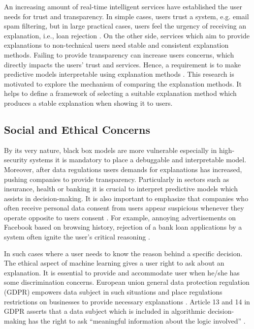 \documentclass[english]{tktltiki2}
\theoremstyle{definition}
\theoremstyle{remark}
\begin{document}
An increasing amount of real-time intelligent services have established the user needs for trust and transparency. In simple cases, users trust a system, e.g. email spam filtering, but in large practical cases, users feel the urgency of receiving an explanation, i.e., loan rejection \citep{guidotti2018survey}. On the other side, services which aim to provide explanations to non-technical users need stable and consistent explanation methods. Failing to provide transparency can increase users concerns, which directly impacts the users' trust and services. Hence, a requirement is to make predictive models interpretable using explanation methods \cite{guidotti2018survey}. This research is motivated to explore the mechanism of comparing the explanation methods. It helps to define a framework of selecting a suitable explanation method which produces a stable explanation when showing it to users.

\subsection{Social and Ethical Concerns} %
By its very nature, black box models are more vulnerable especially in high-security systems it is mandatory to place a debuggable and interpretable model. Moreover, after data regulations users demands for explanations has increased, pushing companies to provide transparency. Particularly in sectors such as insurance, health or banking it is crucial to interpret predictive models which assists in decision-making. It is also important to emphasize that companies who often receive personal data consent from users appear suspicious whenever they operate opposite to users consent \citep{lipton2016mythos}. For example, annoying advertisements on Facebook based on browsing history, rejection of a bank loan applications by a system often ignite the user's critical reasoning \citep{honegger2018shedding}.

In such cases where a user needs to know the reason behind a specific decision. The ethical aspect of machine learning gives a user right to ask about an explanation. It is essential to provide and accommodate user when he/she has some discrimination concerns. European union general data protection regulation (GDPR) empowers data subject in such situations and place regulations restrictions on businesses to provide necessary explanations \citep{doshi2017accountability, goodman2017european} . Article 13 and 14 in GDPR asserts that a data subject which is included in algorithmic decision-making has the right to ask “meaningful information about the logic involved” \citep{goodman2017european}.
\end{document}
